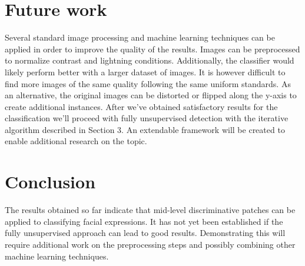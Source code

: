 \documentclass{article}
\begin{document}
\section{Future work}
Several standard image processing and machine learning techniques can be applied in order to improve the quality of the results. Images can be preprocessed to normalize contrast and lightning conditions. Additionally, the classifier would likely perform better with a larger dataset of images. It is however difficult to find more images of the same quality following the same uniform standards. As an alternative, the original images can be distorted or flipped along the y-axis to create additional instances. 
\newline \newline
After we've obtained satisfactory results for the classification we'll proceed with fully unsupervised detection with the iterative algorithm described in Section 3. An extendable framework will be created to enable additional research on the topic.


\section{Conclusion}
The results obtained so far indicate that mid-level discriminative patches can be applied to classifying facial expressions. It has not yet been established if the fully unsupervised approach can lead to good results. Demonstrating this will require additional work on the preprocessing steps and possibly combining other machine learning techniques. 



\end{document}

